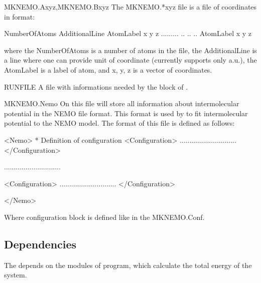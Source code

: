 \begin{filelist}
\item[MKNEMO.Axyz,MKNEMO.Bxyz]
The MKNEMO.*xyz file is a file of coordinates in format:
\begin{sourcelisting}
NumberOfAtoms
AdditionalLine
AtomLabel x  y  z
......... .. .. ..
AtomLabel x  y  z
\end{sourcelisting}
where the NumberOfAtoms is a number of atoms in the file, the AdditionalLine is a line where one can provide unit of coordinate (currently  supports only a.u.), the AtomLabel is a label of atom, and x, y, z is a vector of coordinates.
\item[RUNFILE]
A file with informations needed by the block of \molcas.
\item[MKNEMO.Nemo]
On this file  will store all information about intermolecular potential in the NEMO file format. This format is used by  to fit intermolecular potential to the NEMO model. The format of this file is defined as follows:
\begin{sourcelisting}

<Nemo>
  * Definition of configuration
  <Configuration>
    .............................
  </Configuration>

  .............................

  <Configuration>
    .............................
  </Configuration>

</Nemo>

\end{sourcelisting}
Where configuration block is defined like in the MKNEMO.Conf.

\end{filelist}

\subsection{Dependencies}
\label{UG:sec:mknemo_dependencies}
The  depends on the modules of \program{\molcas} program, which calculate the total energy of the system.


